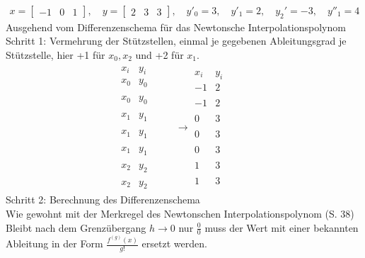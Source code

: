 \documentclass[10pt,a4paper]{article}
\begin{document}
	\begin{align*}
		x = \begin{bmatrix}-1 & 0 & 1\end{bmatrix},\quad y = \begin{bmatrix}2 & 3 & 3\end{bmatrix} ,\quad y'_0 = 3,\quad y'_1 = 2,\quad y_2'=-3,\quad y''_1=4
	\end{align*}
	 Ausgehend vom Differenzenschema für das Newtonsche Interpolationspolynom \\
	 Schritt 1: Vermehrung der Stützstellen, einmal je gegebenen Ableitungsgrad je Stützstelle, hier +1 für $x_0, x_2$ und +2 für $x_1$.
	 \begin{align*}
		 \begin{array}{cc|cccc}
		 	x_i & y_i &  &  &  \\ \hline
		 	x_0 & y_0 &  &  \\
		 	    &     &  &  \\
		 	x_0 & y_0 &  &  \\
		 	    &     &  &  \\
		 	x_1 & y_1 &  &  \\
		 	    &     &  &  \\
		 	x_1 & y_1 &  &  \\
		 	    &     &  &  \\
		 	x_1 & y_1 &  &  \\
		 	    &     &  &  \\
		 	x_2 & y_2 &  &  \\
		 	    &     &  &  \\
		 	x_2 & y_2 &
		 \end{array}
	        \rightarrow
			\begin{array}{cc|cccc}
				x_i & y_i &  &  &  \\ \hline
				-1  &  2  &  &  \\
				    &     &  &  \\
				-1  &  2  &  &  \\
				    &     &  &  \\
				 0  &  3  &  &  \\
				    &     &  &  \\
				 0  &  3  &  &  \\
				    &     &  &  \\
				 0  &  3  &  &  \\
				    &     &  &  \\
				 1  &  3  &  &  \\
				    &     &  &  \\
				 1  &  3  &  &
			\end{array}
		\end{align*}
	\newpage
	Schritt 2: Berechnung des Differenzenschema \\
	Wie gewohnt mit der Merkregel des Newtonschen Interpolationspolynom (S. 38) \\
	Bleibt nach dem Grenzübergang $h \rightarrow 0$ nur $\frac{0}{0}$ muss der Wert mit einer bekannten Ableitung in der Form $\frac{f^{(g)}(x)}{g!}$ ersetzt werden.
	
\end{document}

